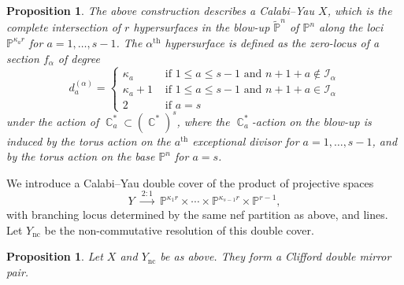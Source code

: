 \documentclass[12pt,a4paper,oneside]{amsart}
\numberwithin{equation}{section}
\newtheorem{prop}[thm]{Proposition}
\theoremstyle{definition}
\theoremstyle{remark}
\DeclareMathOperator{\C}{\mathbb{C}}
\newcommand{\cP}{\mathbb{P}}
\newcommand{\Ync}{Y_{\mathrm{nc}}}
\begin{document}
\begin{prop}
	The above construction describes a Calabi--Yau $X$, which is the complete intersection of $r$ hypersurfaces in the blow-up \(\widetilde{\mathbb{P}}^{n}\) of $\cP^n$ along the loci $\cP^{\kappa_a r}$ for $a=1, \dots, s-1$. The $\alpha^{\text{th}}$ hypersurface is defined as the zero-locus of a section $f_{\alpha}$ of degree 
	\begin{equation*}
		d_a^{(\alpha)} = \begin{cases} \kappa_a & \text{ if } 1 \le a \le s-1 \text{ and } n+1+a \notin \mathcal{I}_{\alpha} \\ \kappa_a +1 & \text{ if } 1 \le a \le s-1 \text{ and } n+1+a \in \mathcal{I}_{\alpha} \\ 2 & \text{ if } a=s \end{cases}
	\end{equation*}
	under the action of $\C^{\ast}_a \subset (\C^{\ast})^s$, where the $\C^{\ast}_a$-action on the blow-up is induced by the torus action on the $a^{\text{th}}$ exceptional divisor for $a=1,\dots, s-1$, and by the torus action on the base $\cP^n$ for $a=s$.
\end{prop}
We introduce a Calabi--Yau double cover of the product of projective spaces
\begin{equation*}
	Y \ \xrightarrow{ \ 2:1 \ } \ \cP^{\kappa_1 r} \times \cdots \times \cP^{\kappa_{s-1} r} \times \cP^{r-1} ,
\end{equation*}
with branching locus determined by the same nef partition as above, and lines. Let $\Ync$ be the non-commutative resolution of this double cover.
\begin{prop}
Let $X$ and $\Ync$ be as above. They form a Clifford double mirror pair.
\end{prop}
\end{document}

